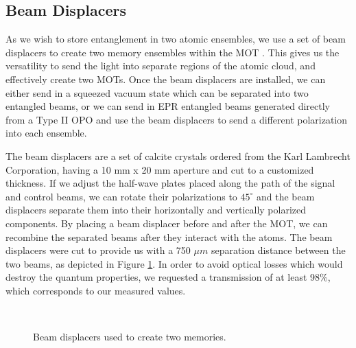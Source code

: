 \clearpage

\subsection{Beam Displacers}

As we wish to store entanglement in two atomic ensembles, we use a set of beam displacers to create two memory ensembles within the MOT \cite{choi2008mapping}.  This gives us the versatility to send the light into separate regions of the atomic cloud, and effectively create two MOTs.  Once the beam displacers are installed, we can either send in a squeezed vacuum state which can be separated into two entangled beams, or we can send in EPR entangled beams generated directly from a Type II OPO \cite{LauratPHD} and use the beam displacers to send a different polarization into each ensemble.

The beam displacers are a set of calcite crystals ordered from the Karl
Lambrecht Corporation, having a 10 mm x 20 mm aperture and cut to a customized
thickness.  If we adjust the half-wave plates placed along the path of the signal and control beams, we can rotate their polarizations to $45^\circ$  and the beam displacers separate them into their horizontally and vertically polarized components.  By placing a beam displacer before and after the MOT, we can recombine the separated beams after they interact with the atoms. The beam displacers were cut to provide us with a 750 $\mu m$ separation distance between the two beams, as depicted in Figure \ref{fig:bd_diagram}.  In order to avoid optical losses which would destroy the quantum properties, we requested a transmission of at least 98\%, which corresponds to our measured values.



\begin{figure}[!ht]
  \centering
   \\
     \vspace{20pt}
  \caption[Beam displacer schematic]{Beam displacers used to create two memories.}
  \label{fig:bd_diagram}
\end{figure}  
     

